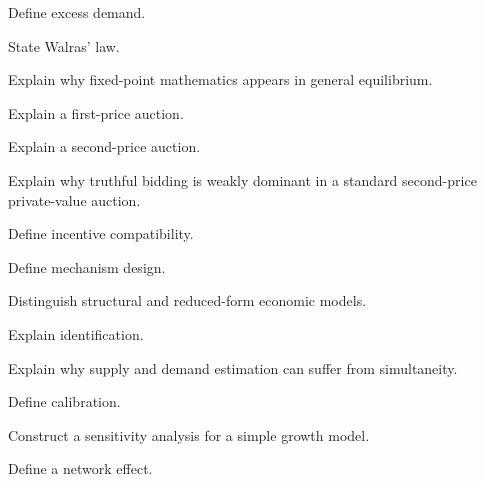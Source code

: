 \begin{exercise}[2]
Define excess demand.
\end{exercise}

\begin{exercise}[2]
State Walras' law.
\end{exercise}

\begin{exercise}[3]
Explain why fixed-point mathematics appears in general equilibrium.
\end{exercise}

\begin{exercise}[2]
Explain a first-price auction.
\end{exercise}

\begin{exercise}[2]
Explain a second-price auction.
\end{exercise}

\begin{exercise}[3]
Explain why truthful bidding is weakly dominant in a standard second-price
private-value auction.
\end{exercise}

\begin{exercise}[2]
Define incentive compatibility.
\end{exercise}

\begin{exercise}[2]
Define mechanism design.
\end{exercise}

\begin{exercise}[2]
Distinguish structural and reduced-form economic models.
\end{exercise}

\begin{exercise}[3]
Explain identification.
\end{exercise}

\begin{exercise}[3]
Explain why supply and demand estimation can suffer from simultaneity.
\end{exercise}

\begin{exercise}[2]
Define calibration.
\end{exercise}

\begin{exercise}[3]
Construct a sensitivity analysis for a simple growth model.
\end{exercise}

\begin{exercise}[2]
Define a network effect.
\end{exercise}

